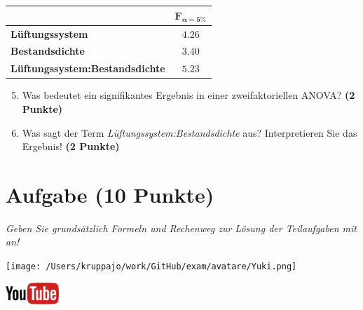\documentclass[a4paper, 9pt]{scrartcl}\usepackage[]{graphicx}\usepackage[]{xcolor}
\begin{document}
\begin{center}
    \Large
\begin{tabular}{lc}
  \toprule
     & $\boldsymbol{F_{\alpha = 5\%}}$ \\
\midrule
  \textbf{Lüftungssystem} & $4.26$ \\
  \textbf{Bestandsdichte} & $3.40$ \\
  \textbf{Lüftungssystem:Bestandsdichte} & $5.23$ \\
  \bottomrule
  \end{tabular}
\end{center}

\begin{enumerate}
  \setcounter{enumi}{4}
\item Was bedeutet ein signifikantes Ergebnis in einer zweifaktoriellen ANOVA? \textbf{(2 Punkte)}
\item Was sagt der Term \textit{Lüftungssystem:Bestandsdichte} aus? Interpretieren Sie das Ergebnis! \textbf{(2 Punkte)}
\end{enumerate}
 
\clearpage

\section{Aufgabe \hfill (10 Punkte)}

\textit{Geben Sie grundsätzlich Formeln und Rechenweg zur Lösung der Teilaufgaben mit an!} \\[1Ex]
 

 
\begin{minipage}[t]{0.5\textwidth}
\texttt{[image: /Users/kruppajo/work/GitHub/exam/avatare/Yuki.png]}
\end{minipage}
\begin{minipage}[t]{0.5\textwidth}
\hfill
\href{https://youtu.be/rWTyHXXlYjY}{\includegraphics[width = 2cm]{img/youtube}}\\[1Ex]
\end{minipage}
\vspace{1ex}
\end{document}
